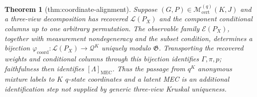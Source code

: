 \documentclass{article}
\newtheorem{theorem}{Theorem}
\begin{document}
\begin{theorem}[thm:coordinate-alignment]\label{thm:coordinate-alignment}
Suppose \((G,P)\in\mathcal M_{\mathrm{cert}}^{(q)}(K,J)\) and a three-view decomposition has recovered \(\mathscr L(P_X)\) and the component conditional columns up to one arbitrary permutation. The observable family \(\mathcal E(P_X)\), together with measurement nondegeneracy and the subset condition, determines a bijection \(\varphi_{\mathrm{coord}}:\mathscr L(P_X)\to\mathcal Q^K\) uniquely modulo \(\mathfrak G\). Transporting the recovered weights and conditional columns through this bijection identifies \(\Gamma,\pi,p\); faithfulness then identifies \([\Lambda]_{\mathrm{MEC}}\). Thus the passage from \(q^K\) anonymous mixture labels to \(K\) \(q\)-state coordinates and a latent MEC is an additional identification step not supplied by generic three-view Kruskal uniqueness.
\end{theorem}
\end{document}

